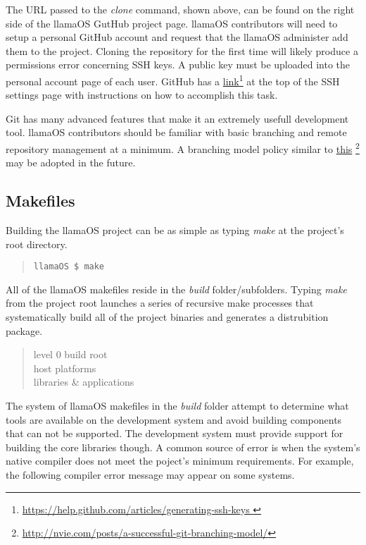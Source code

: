 \documentclass[draft]{article}
\begin{document}
The URL passed to the \emph{clone} command, shown above, can be found on the 
right side of the llamaOS GutHub project page.  llamaOS contributors will need 
to setup a personal GitHub account and request that the llamaOS administer add 
them to the project.  Cloning the repository for the first time will likely 
produce a permissions error concerning SSH keys.  A public key must be uploaded 
into the personal account page of each user.  GitHub has a 
\href{https://help.github.com/articles/generating-ssh-keys}{link}\footnote{\url{
https://help.github.com/articles/generating-ssh-keys }} at the top of the SSH 
settings page with instructions on how to accomplish this task.

Git has many advanced features that make it an extremely usefull development 
tool.  llamaOS contributors should be familiar with basic branching and remote 
repository management at a minimum.  A branching model policy similar to 
\href{http://nvie.com/posts/a-successful-git-branching-model/}{this}
\footnote { \url { http://nvie.com/posts/a-successful-git-branching-model/}} 
may be adopted in the future.

\subsection{Makefiles}

Building the llamaOS project can be as simple as typing \emph{make} at the 
project's root directory.

\begin{quote}
\texttt{llamaOS \$ make}
\end{quote}

All of the llamaOS makefiles reside in the \emph{build} folder/subfolders.  
Typing \emph{make} from the project root launches a series of recursive make 
processes that systematically build all of the project binaries and generates a 
distrubition package.  

\begin{quote}
level 0 \hspace{0.5in}build root\\
host platforms\\
libraries \& applications
\end{quote}



The system of llamaOS makefiles in the \emph{build} folder attempt to determine 
what tools are available on the development system and avoid building 
components that can not be supported.  The development system must provide 
support for building the core libraries though.  A common source of error is 
when the system's native compiler does not meet the poject's minimum 
requirements.  For example, the following compiler error message may appear on 
some systems.
\end{document}
